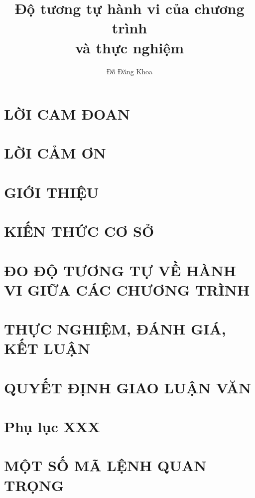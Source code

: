 \documentclass[12pt,a4paper,oneside,openright]{memoir}
\title{Độ tương tự hành vi của chương trình \\ và thực nghiệm}
\author{Đỗ Đăng Khoa}
\begin{document}




\chapter*{LỜI CAM ĐOAN}


\chapter*{LỜI CẢM ƠN}




\newpage
\tableofcontents




\chapter{GIỚI THIỆU}


\chapter{KIẾN THỨC CƠ SỞ}


\chapter{ĐO ĐỘ TƯƠNG TỰ VỀ HÀNH VI GIỮA CÁC CHƯƠNG TRÌNH}


\chapter{THỰC NGHIỆM, ĐÁNH GIÁ, KẾT LUẬN}




\nocite{*} %


\appendix

\chapter{QUYẾT ĐỊNH GIAO LUẬN VĂN}

%

\chapter{Phụ lục XXX}


\chapter{MỘT SỐ MÃ LỆNH QUAN TRỌNG}

\end{document}
